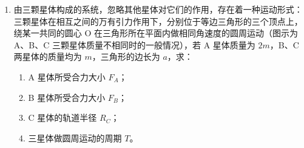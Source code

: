 \documentclass[\gkver]{gaokaozhenti}
\begin{document}
\begin{enumerate}
{	解得 $T=\sqrt{\frac{2ml_{0}}{qE}}$，

	则 A→C 过程所经历的时间 $t=3\sqrt{\frac{2ml_{0}}{qE}}$。


	（3）粒子在 DC 段做类平抛运动，于是有

	$2l_{0}=v_{Cx}(2T)$，$v_{Cy}=a(2T)$，

	$v_{C}=\sqrt{v_{Cx}^{2}+v_{Cy}^{2}}=\sqrt{\frac{17qEl_{0}}{2m}}$。
}

\item
由三颗星体构成的系统，忽略其他星体对它们的作用，存在着一种运动形式：三颗星体在相互之间的万有引力作用下，分别位于等边三角形的三个顶点上，绕某一共同的圆心 O 在三角形所在平面内做相同角速度的圆周运动（图示为 A、B、C 三颗星体质量不相同时的一般情况），若 A 星体质量为 $2m$，B、C 两星体的质量均为 $m$，三角形的边长为 $a$，求：

\begin{enumerate}
	\item
	A 星体所受合力大小 $F_{A}$；

	\item
	B 星体所受合力大小 $F_{B}$；

	\item
	C 星体的轨道半径 $R_{C}$；

	\item
	三星体做圆周运动的周期 $T$。
\end{enumerate}


\end{enumerate}
\end{document}
